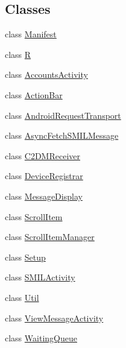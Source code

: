 \subsection*{Classes}
\begin{DoxyCompactItemize}
\item 
class \hyperlink{classcsc440_1_1nuf_1_1_manifest}{Manifest}
\item 
class \hyperlink{classcsc440_1_1nuf_1_1_r}{R}
\item 
class \hyperlink{classcsc440_1_1nuf_1_1_accounts_activity}{Accounts\-Activity}
\item 
class \hyperlink{classcsc440_1_1nuf_1_1_action_bar}{Action\-Bar}
\item 
class \hyperlink{classcsc440_1_1nuf_1_1_android_request_transport}{Android\-Request\-Transport}
\item 
class \hyperlink{classcsc440_1_1nuf_1_1_async_fetch_s_m_i_l_message}{Async\-Fetch\-S\-M\-I\-L\-Message}
\item 
class \hyperlink{classcsc440_1_1nuf_1_1_c2_d_m_receiver}{C2\-D\-M\-Receiver}
\item 
class \hyperlink{classcsc440_1_1nuf_1_1_device_registrar}{Device\-Registrar}
\item 
class \hyperlink{classcsc440_1_1nuf_1_1_message_display}{Message\-Display}
\item 
class \hyperlink{classcsc440_1_1nuf_1_1_scroll_item}{Scroll\-Item}
\item 
class \hyperlink{classcsc440_1_1nuf_1_1_scroll_item_manager}{Scroll\-Item\-Manager}
\item 
class \hyperlink{classcsc440_1_1nuf_1_1_setup}{Setup}
\item 
class \hyperlink{classcsc440_1_1nuf_1_1_s_m_i_l_activity}{S\-M\-I\-L\-Activity}
\item 
class \hyperlink{classcsc440_1_1nuf_1_1_util}{Util}
\item 
class \hyperlink{classcsc440_1_1nuf_1_1_view_message_activity}{View\-Message\-Activity}
\item 
class \hyperlink{classcsc440_1_1nuf_1_1_waiting_queue}{Waiting\-Queue}
\end{DoxyCompactItemize}
